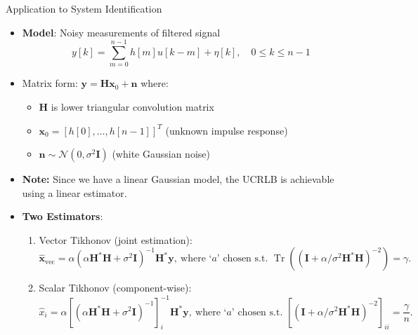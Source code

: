 \documentclass{beamer}
\begin{document}
\begin{frame}{Application to System Identification}
\begin{itemize}

\item \textbf{Model}: Noisy measurements of filtered signal
\[ y[k] = \sum_{m=0}^{n-1} h[m]u[k-m] + \eta[k], \quad 0 \leq k \leq n-1 \]
\item Matrix form: $\mathbf{y} = \mathbf{H}\mathbf{x}_0 + \mathbf{n}$ where:
\begin{itemize}
\item $\mathbf{H}$ is lower triangular convolution matrix
\item $\mathbf{x}_0 = [h[0], \ldots, h[n-1]]^T$ (unknown impulse response)
\item $\mathbf{n} \sim \mathcal{N}(0,\sigma^2\mathbf{I})$ (white Gaussian noise)
\end{itemize}

\item \textbf{Note:} Since we have a linear Gaussian model, the UCRLB is achievable using a 
linear estimator. 

\item \textbf{Two Estimators}:
\begin{enumerate}
\item Vector Tikhonov (joint estimation):
\[ \hat{\mathbf{x}}_{\text{vec}} = \alpha(\alpha\mathbf{H}^*\mathbf{H} + \sigma^2\mathbf{I})^{-1}\mathbf{H}^*\mathbf{y},  \ 
\scriptstyle \text{where `$a$' chosen s.t. } \operatorname{Tr}((\mathbf{I} + \alpha/\sigma^2 \mathbf{H}^*\mathbf{H})^{-2}) = \gamma.
\]
\item Scalar Tikhonov (component-wise):
\[ \hat{x}_i = \alpha[(\alpha\mathbf{H}^*\mathbf{H} + \sigma^2\mathbf{I})^{-1}]_i^{-1}\mathbf{H}^*\mathbf{y}, \ 
\scriptstyle \text{where `$a$' chosen s.t. } [(\mathbf{I} + \alpha/\sigma^2 \mathbf{H}^*\mathbf{H})^{-2}]_{ii} = \frac{\gamma}{n}.
\]
\end{enumerate}
\end{itemize}
\end{frame}
\end{document}
